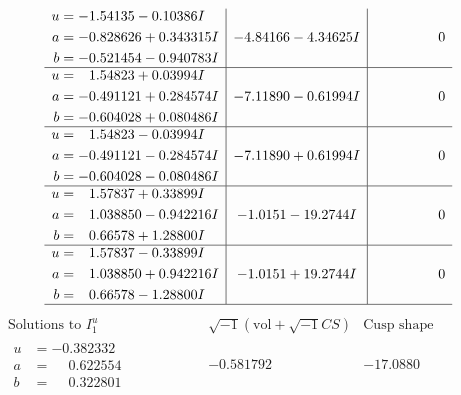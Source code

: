 \documentclass[1p]{elsarticle_modified}
\theoremstyle{definition}
\newcommand{\I}{\sqrt{-1}}
\begin{document}
$$\begin{array}{c|c|c}
\begin{aligned}
u &= -1.54135 - 0.10386 I \\
a &= -0.828626 + 0.343315 I \\
b &= -0.521454 - 0.940783 I\end{aligned}
 & -4.84166 - 4.34625 I & \phantom{-0.000000 } 0 \\ \hline\begin{aligned}
u &= \phantom{-}1.54823 + 0.03994 I \\
a &= -0.491121 + 0.284574 I \\
b &= -0.604028 + 0.080486 I\end{aligned}
 & -7.11890 - 0.61994 I & \phantom{-0.000000 } 0 \\ \hline\begin{aligned}
u &= \phantom{-}1.54823 - 0.03994 I \\
a &= -0.491121 - 0.284574 I \\
b &= -0.604028 - 0.080486 I\end{aligned}
 & -7.11890 + 0.61994 I & \phantom{-0.000000 } 0 \\ \hline\begin{aligned}
u &= \phantom{-}1.57837 + 0.33899 I \\
a &= \phantom{-}1.038850 - 0.942216 I \\
b &= \phantom{-}0.66578 + 1.28800 I\end{aligned}
 & -1.0151 - 19.2744 I & \phantom{-0.000000 } 0 \\ \hline\begin{aligned}
u &= \phantom{-}1.57837 - 0.33899 I \\
a &= \phantom{-}1.038850 + 0.942216 I \\
b &= \phantom{-}0.66578 - 1.28800 I\end{aligned}
 & -1.0151 + 19.2744 I & \phantom{-0.000000 } 0\\
 \hline 
 \end{array}$$\newpage$$\begin{array}{c|c|c}  
\text{Solutions to }I^u_{1}& \I (\text{vol} + \sqrt{-1}CS) & \text{Cusp shape}\\
 \hline 
\begin{aligned}
u &= -0.382332\phantom{ +0.000000I} \\
a &= \phantom{-}0.622554\phantom{ +0.000000I} \\
b &= \phantom{-}0.322801\phantom{ +0.000000I}\end{aligned}
 & -0.581792\phantom{ +0.000000I} & -17.0880\phantom{ +0.000000I} \\ \hline\begin{aligned}

\end{aligned}
\end{array}$$
\end{document}
